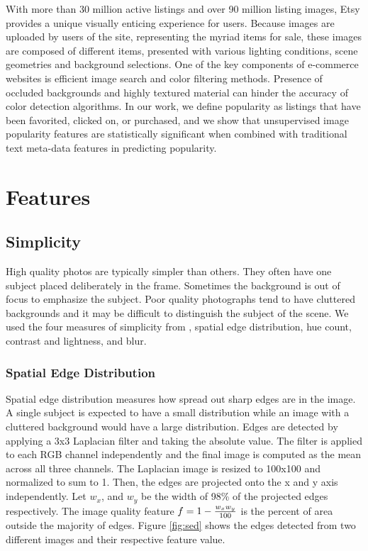 \documentclass[conference,a4paper]{IEEEtran}
\begin{document}
With more than 30 million active listings and over 90 million listing images, Etsy provides a unique visually enticing experience
for users. Because images are uploaded by users of the site,
representing the myriad items for sale, these images are composed of different items, presented with various
lighting conditions, scene geometries and background selections. One of
the key components of e-commerce websites is
efficient image search and color filtering methods. Presence of occluded backgrounds and highly
textured material can hinder the accuracy of color detection
algorithms.  In our work, we define popularity as listings that have been favorited, clicked on, or purchased, and we show that unsupervised image popularity features are statistically significant when combined with traditional text meta-data features in predicting popularity.

\section{Features}
\label{sec:features}
  \subsection{Simplicity}
  High quality photos are typically simpler than others.  They often have one subject placed deliberately in the frame.  Sometimes the background is out of focus to emphasize the subject.  Poor quality photographs tend to have cluttered backgrounds and it may be difficult to distinguish the subject of the scene.  We used the four measures of simplicity from \cite{ke2006design}, spatial edge distribution, hue count, contrast and lightness, and blur.

  \subsubsection{Spatial Edge Distribution}
  Spatial edge distribution measures how spread out sharp edges are in the image.  A single subject is expected to have a small distribution while an image with a cluttered background would have a large distribution.  Edges are detected by applying a 3x3 Laplacian filter and taking the absolute value.  The filter is applied to each RGB channel independently and the final image is computed as the mean across all three channels.  The Laplacian image is resized to 100x100 and normalized to sum to 1.  Then, the edges are projected onto the x and y axis independently.  Let $w_x$, and $w_y$ be the width of 98\% of the projected edges respectively.  The image quality feature $f = 1 - {w_x w_y \over 100}$ is the percent of area outside the majority of edges.  Figure \ref{fig:sed} shows the edges detected from two different images and their respective feature value.
\end{document}
